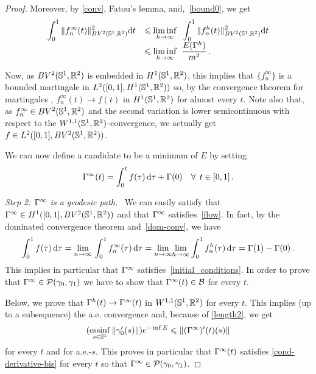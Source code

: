 \begin{proof}
Moreover, by \eqref{conv}, Fatou's lemma, and,~\eqref{bound0},  we get
$$
\begin{array}{ll}
\displaystyle{ \int_0^1\|f_n^\infty(t)\|^2_{BV^2(\mathbb{S}^1,\mathbb{R}^2)} \mathrm{d}t }&\displaystyle{\leqslant\underset{h\rightarrow \infty}{\liminf} \;\; \int_0^1\|f^h_n(t)\|^2_{BV^2(\mathbb{S}^1,\mathbb{R}^2)}\mathrm{d}t}\\
 & \displaystyle{\leqslant\underset{h\rightarrow \infty}{\liminf} \;\; \frac{E(\Gamma^h)}{m^2}}\,.
 \end{array}
$$
\par Now, as $BV^2(\mathbb{S}^1,\mathbb{R}^2)$ is embedded in $H^1(\mathbb{S}^1,\mathbb{R}^2)$, this implies that $\{f^\infty_n\}$ is a bounded  martingale in $L^2([0,1],H^1(\mathbb{S}^1,\mathbb{R}^2))$ so, by the convergence theorem for martingales \cite[Theorem 4]{Chatterji},  $f^\infty_n(t)\rightarrow f(t)$ in $H^1(\mathbb{S}^1,\mathbb{R}^2)$ for almost every $t$. 
Note also that, as $f^\infty_n\in BV^2(\mathbb{S}^1,\mathbb{R}^2)$ and the second variation is lower semicontinuous with respect to the $W^{1,1}(\mathbb{S}^1,\mathbb{R}^2)$-convergence, we actually get $f\in L^2([0,1],BV^2(\mathbb{S}^1,\mathbb{R}^2))$.

We can now define a candidate to be a minimum  of $E$ by setting
\begin{equation}\label{formula}
\Gamma^\infty(t)= \int_0^t f(\tau)\, \mathrm{d} \tau +\Gamma(0) \quad \forall \, \; t\in [0,1]\,.
\end{equation}

\medskip
\noindent
{\em Step 2: $\Gamma^\infty$ is a geodesic path.}
\, 
We can easily satisfy that  $\Gamma^\infty\in H^1([0,1],BV^2(\mathbb{S}^1,\mathbb{R}^2))$ and that $\Gamma^\infty$ satisfies~\eqref{flow}. In fact, by the dominated convergence theorem and~\eqref{dom-conv}, we have
$$\int_0^1 f(\tau)\, \mathrm{d} \tau = \underset{n\rightarrow \infty}{\lim} \, \int_0^1 f_n^\infty(\tau)\, \mathrm{d} \tau = \underset{n\rightarrow \infty}{\lim}\underset{h\rightarrow \infty}{\lim}\int_0^1 f_n^h(\tau)\, \mathrm{d} \tau = \Gamma(1)-\Gamma(0)\,.$$
This implies in particular that $\Gamma^\infty$ satisfies~\eqref{initial_conditions}. In order to prove that  $\Gamma^\infty\in \mathcal{P}(\gamma_0,\gamma_1)$ we have to show that $\Gamma^\infty(t)\in \mathcal{B}$  for every $t$. 

Below, we prove that $ \Gamma^h(t) \rightarrow \Gamma^\infty(t)$ in ${W^{1,1}(\mathbb{S}^1,\mathbb{R}^2)}$ for every $t$. This implies (up to a subsequence) the a.e. convergence and, because of \eqref{length2}, we get
$$(\underset{s\in \mathbb{S}^1}{\rm{essinf}}\,\|\gamma_0'(s)\|)e^{-  \inf E}	\leqslant \|(\Gamma^\infty)'(t)(s)\|$$
for every $t$ and for a.e.-$s$. This proves in particular that $\Gamma^\infty(t)$ satisfies \eqref{cond-derivative-bis} for every $t$ so that   $\Gamma^\infty\in \mathcal{P}(\gamma_0,\gamma_1)$.


\end{proof}
